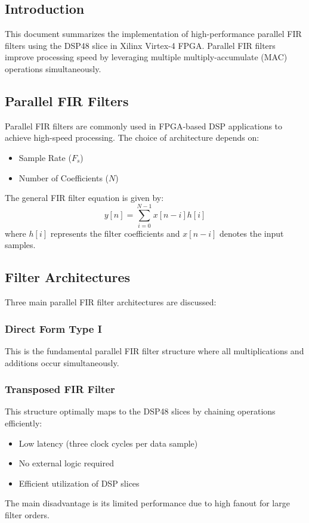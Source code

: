 \documentclass{article}
\begin{document}
	\subsection{Introduction}
	This document summarizes the implementation of high-performance parallel FIR filters using the DSP48 slice in Xilinx Virtex-4 FPGA. Parallel FIR filters improve processing speed by leveraging multiple multiply-accumulate (MAC) operations simultaneously.
	
	\subsection{Parallel FIR Filters}
	Parallel FIR filters are commonly used in FPGA-based DSP applications to achieve high-speed processing. The choice of architecture depends on:
	\begin{itemize}
		\item Sample Rate ($F_s$)
		\item Number of Coefficients ($N$)
	\end{itemize}
	The general FIR filter equation is given by:
	\begin{equation}
		y[n] = \sum_{i=0}^{N-1} x[n-i] h[i]
	\end{equation}
	where $h[i]$ represents the filter coefficients and $x[n-i]$ denotes the input samples.
	
	\subsection{Filter Architectures}
	Three main parallel FIR filter architectures are discussed:
	
	\subsubsection{Direct Form Type I}
	This is the fundamental parallel FIR filter structure where all multiplications and additions occur simultaneously.
	
	\subsubsection{Transposed FIR Filter}
	This structure optimally maps to the DSP48 slices by chaining operations efficiently:
	\begin{itemize}
		\item Low latency (three clock cycles per data sample)
		\item No external logic required
		\item Efficient utilization of DSP slices
	\end{itemize}
	The main disadvantage is its limited performance due to high fanout for large filter orders.
	
\end{document}

